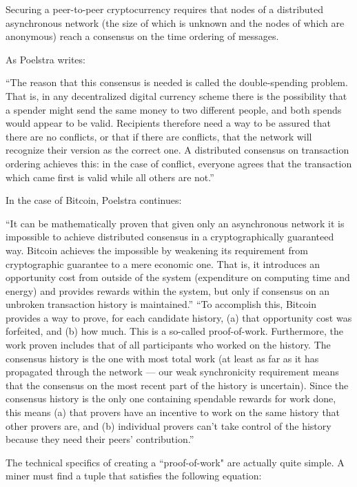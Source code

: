 \documentclass[a4paper,11pt]{article}
\begin{document}
Securing a peer-to-peer cryptocurrency requires that nodes of a distributed asynchronous network (the size of which is unknown and the nodes of which are anonymous) reach a consensus on the time ordering of messages.




As Poelstra writes\cite{distributedconsensus}:

``The reason that this consensus is needed is called the double-spending problem. That is, in any decentralized digital currency scheme there is the possibility that a spender might send the same money to two different people, and both spends would appear to be valid. Recipients therefore need a way to be assured that there are no conflicts, or that if there are conflicts, that the network will recognize their version as the correct one. A distributed consensus on transaction ordering achieves this: in the case of conflict, everyone agrees that the transaction which came first is valid while all others are not.''

In the case of Bitcoin, Poelstra continues:

``It can be mathematically proven that given only an asynchronous network it is impossible to achieve distributed consensus in a cryptographically guaranteed way\cite{Fischer}. Bitcoin achieves the impossible by weakening its requirement from cryptographic guarantee to a mere economic one. That is, it introduces an opportunity cost from outside of the system (expenditure on computing time and energy) and provides rewards within the system, but only if consensus on an unbroken transaction history is maintained.''
``To accomplish this, Bitcoin provides a way to prove, for each candidate history, (a) that opportunity cost was forfeited, and (b) how much. This is a so-called proof-of-work. Furthermore, the work proven includes that of all participants who worked on the history. The consensus history is the one with most total work (at least as far as it has propagated through the network — our weak synchronicity requirement means that the consensus on the most recent part of the history is uncertain). Since the consensus history is the only one containing spendable rewards for work done, this means (a) that provers have an incentive to work on the same history that other provers are, and (b) individual provers can't take control of the history because they need their peers' contribution.''

The technical specifics of creating a ``proof-of-work" are actually quite simple. A miner must find a tuple that satisfies the following equation:
\end{document}
